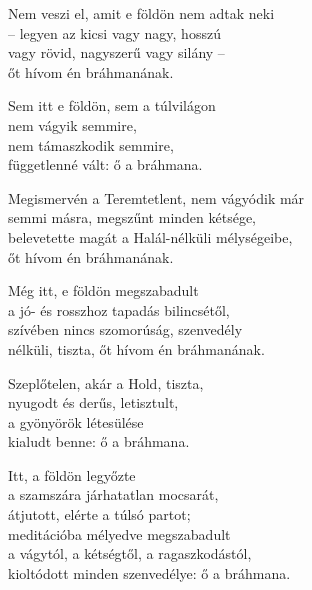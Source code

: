 \begin{dhpverse}

 Nem veszi el, amit e földön nem adtak neki\\
– legyen az kicsi vagy nagy, hosszú\\
vagy rövid, nagyszerű vagy silány –\\
őt hívom én bráhmanának.

\vspace*{-0.2\baselineskip}
 Sem itt e földön, sem a túlvilágon\\
nem vágyik semmire,\\
nem támaszkodik semmire,\\
függetlenné vált: ő a bráhmana.

\vspace*{-0.2\baselineskip}
 Megismervén a Teremtetlent, nem vágyódik már\\
semmi másra, megszűnt minden kétsége,\\
belevetette magát a Halál-nélküli mélységeibe,\\
őt hívom én bráhmanának.

\vspace*{-0.2\baselineskip}
 Még itt, e földön megszabadult\\
a jó- és rosszhoz tapadás bilincsétől,\\
szívében nincs szomorúság, szenvedély\\
nélküli, tiszta, őt hívom én bráhmanának.

\vspace*{-0.2\baselineskip}
 Szeplőtelen, akár a Hold, tiszta,\\
nyugodt és derűs, letisztult,\\
a gyönyörök létesülése\\
kialudt benne: ő a bráhmana.

\vspace*{-0.2\baselineskip}
 Itt, a földön legyőzte\\
a szamszára járhatatlan mocsarát,\\
átjutott, elérte a túlsó partot;\\
meditációba mélyedve megszabadult\\
a vágytól, a kétségtől, a ragaszkodástól,\\
kioltódott minden szenvedélye: ő a bráhmana.

\end{dhpverse}
\newpage
